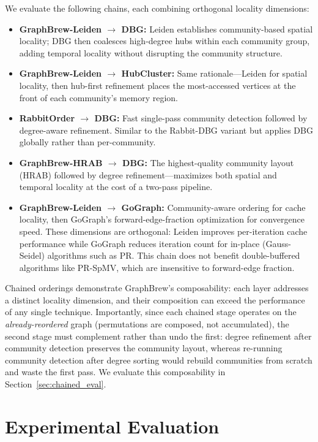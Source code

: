 \documentclass[sigconf, nonacm]{acmart}
\begin{document}
We evaluate the following chains, each combining orthogonal locality dimensions:
\begin{itemize}[topsep=2pt,itemsep=1pt]
\item \textbf{GraphBrew-Leiden {\small$\to$} DBG:} Leiden establishes community-based spatial locality; DBG then coalesces high-degree hubs within each community group, adding temporal locality without disrupting the community structure.
\item \textbf{GraphBrew-Leiden {\small$\to$} HubCluster:} Same rationale---Leiden for spatial locality, then hub-first refinement places the most-accessed vertices at the front of each community's memory region.
\item \textbf{RabbitOrder {\small$\to$} DBG:} Fast single-pass community detection followed by degree-aware refinement. Similar to the Rabbit-DBG variant but applies DBG globally rather than per-community.
\item \textbf{GraphBrew-HRAB {\small$\to$} DBG:} The highest-quality community layout (HRAB) followed by degree refinement---maximizes both spatial and temporal locality at the cost of a two-pass pipeline.
\item \textbf{GraphBrew-Leiden {\small$\to$} GoGraph:} Community-aware ordering for cache locality, then GoGraph's forward-edge-fraction optimization for convergence speed. These dimensions are orthogonal: Leiden improves per-iteration cache performance while GoGraph reduces iteration count for in-place (Gauss-Seidel) algorithms such as PR. This chain does not benefit double-buffered algorithms like PR-SpMV, which are insensitive to forward-edge fraction.
\end{itemize}
Chained orderings demonstrate GraphBrew's composability: each layer addresses a distinct locality dimension, and their composition can exceed the performance of any single technique. Importantly, since each chained stage operates on the \emph{already-reordered} graph (permutations are composed, not accumulated), the second stage must complement rather than undo the first: degree refinement after community detection preserves the community layout, whereas re-running community detection after degree sorting would rebuild communities from scratch and waste the first pass. We evaluate this composability in Section~\ref{sec:chained_eval}.

\section{Experimental Evaluation}
\label{sec:eval}
\end{document}
